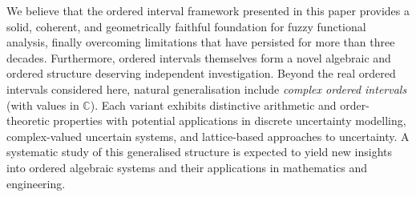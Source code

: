 \documentclass[preprint,12pt]{elsarticle}
\theoremstyle{definition}
\begin{document}
We believe that the ordered interval framework presented in this paper provides a solid, coherent, and geometrically faithful foundation for fuzzy functional analysis, finally overcoming limitations that have persisted for more than three decades.
Furthermore, ordered intervals themselves form a novel algebraic and ordered structure deserving independent investigation. Beyond the real ordered intervals considered here, natural generalisation include  \emph{complex ordered intervals} (with values in $\mathbb{C}$). Each variant exhibits distinctive arithmetic and order-theoretic properties with potential applications in discrete uncertainty modelling, complex-valued uncertain systems, and lattice-based approaches to uncertainty. A systematic study of this generalised structure is expected to yield new insights into ordered algebraic systems and their applications in mathematics and engineering.



\end{document}
